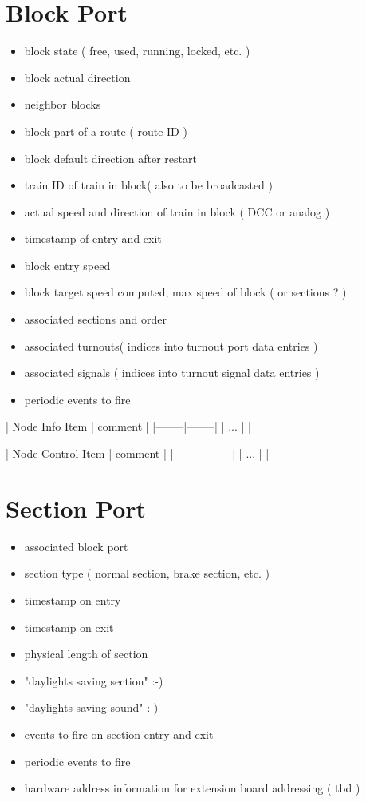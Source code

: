 \section{Block Port}

\begin{itemize}
\item block state ( free, used, running, locked, etc. )
\item block actual direction
\item neighbor blocks
\item block part of a route ( route ID )
\item block default direction after restart
\item train ID of train in block( also to be broadcasted )
\item actual speed and direction of train in block ( DCC or analog )
\item timestamp of entry and exit
\item block entry speed
\item block target speed computed, max speed of block ( or sections ? )
\item associated sections and order
\item associated turnouts( indices into turnout port data entries )
\item associated signals ( indices into turnout signal data entries )
\item periodic events to fire
\end{itemize}

| Node Info Item | comment |
|--------|--------|
| ... | |

| Node Control Item | comment |
|--------|--------|
| ... | |

\section{Section Port}

\begin{itemize}
\item associated block port
\item section type ( normal section, brake section, etc. )
\item timestamp on entry
\item timestamp on exit
\item physical length of section
\item "daylights saving section" :-)
\item "daylights saving sound" :-)
\item events to fire on section entry and exit
\item periodic events to fire
\item hardware address information for extension board addressing ( tbd )
\end{itemize}


